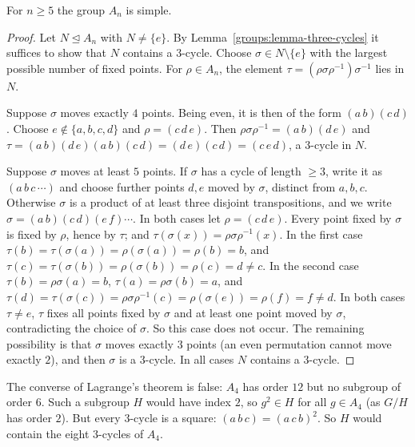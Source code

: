 \begin{theorem}\label{groups:theorem-alternating-simple}
For $n \geq 5$ the group $A_n$ is simple.
\end{theorem}

\begin{proof}
Let $N \trianglelefteq A_n$ with $N \neq \{e\}$. By Lemma~\ref{groups:lemma-three-cycles}
it suffices to show that $N$ contains a $3$-cycle. Choose $\sigma \in N \setminus \{e\}$
with the largest possible number of fixed points. For $\rho \in A_n$, the element
$\tau = (\rho\sigma\rho^{-1})\sigma^{-1}$ lies in $N$.

Suppose $\sigma$ moves exactly $4$ points. Being even, it is then of the form
$(a\,b)(c\,d)$. Choose $e \notin \{a, b, c, d\}$ and $\rho = (c\,d\,e)$. Then
$\rho\sigma\rho^{-1} = (a\,b)(d\,e)$ and $\tau = (a\,b)(d\,e)(a\,b)(c\,d) = (d\,e)(c\,d) = (c\,e\,d)$,
a $3$-cycle in $N$.

Suppose $\sigma$ moves at least $5$ points. If $\sigma$ has a cycle of length
$\geq 3$, write it as $(a\,b\,c\,\cdots)$ and choose further points $d, e$ moved by $\sigma$,
distinct from $a, b, c$. Otherwise $\sigma$ is a product of at least three disjoint
transpositions, and we write $\sigma = (a\,b)(c\,d)(e\,f)\cdots$. In both cases let
$\rho = (c\,d\,e)$. Every point fixed by $\sigma$ is fixed by $\rho$, hence by $\tau$; and
$\tau(\sigma(x)) = \rho\sigma\rho^{-1}(x)$. In the first case $\tau(b) = \tau(\sigma(a)) = \rho(\sigma(a)) = \rho(b) = b$,
and $\tau(c) = \tau(\sigma(b)) = \rho(\sigma(b)) = \rho(c) = d \neq c$. In the second case
$\tau(b) = \rho\sigma(a) = b$, $\tau(a) = \rho\sigma(b) = a$, and $\tau(d) = \tau(\sigma(c)) = \rho\sigma\rho^{-1}(c) = \rho(\sigma(e)) = \rho(f) = f \neq d$.
In both cases $\tau \neq e$, $\tau$ fixes all points fixed by $\sigma$ and at least one
point moved by $\sigma$, contradicting the choice of $\sigma$. So this case does not
occur. The remaining possibility is that $\sigma$ moves exactly $3$ points (an even
permutation cannot move exactly $2$), and then $\sigma$ is a $3$-cycle. In all cases $N$
contains a $3$-cycle.
\end{proof}

\begin{counterexample}\label{groups:counterexample-converse-lagrange}
The converse of Lagrange's theorem is false: $A_4$ has order $12$ but no subgroup
of order $6$. Such a subgroup $H$ would have index $2$, so $g^2 \in H$ for all
$g \in A_4$ (as $G/H$ has order $2$). But every $3$-cycle is a square:
$(a\,b\,c) = (a\,c\,b)^2$. So $H$ would contain the eight $3$-cycles of $A_4$.
\end{counterexample}

